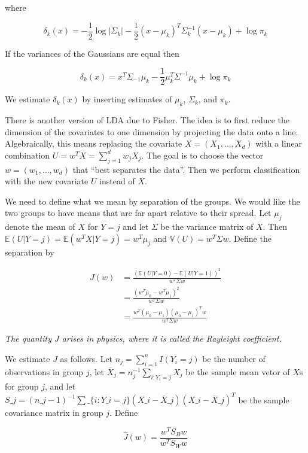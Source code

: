 where

\[ \delta_{k}(x) = -\frac{1}{2} \log | \Sigma_{k} | - \frac{1}{2} (x - \mu_{k})^T \Sigma_{k}^{-1} (x - \mu_{k}) + \log \pi_{k} \]

If the variances of the Gaussians are equal then

\[ \delta_{k}(x) = x^T \Sigma_{-1} \mu_{k} - \frac{1}{2} \mu_{k}^T \Sigma^{-1} \mu_{k} + \log \pi_{k} \]

We estimate \(\delta_{k}(x)\) by inserting estimates of \(\mu_{k}\),
\(\Sigma_{k}\), and \(\pi_{k}\).

There is another version of LDA due to Fisher. The idea is to first
reduce the dimension of the covariates to one dimension by projecting
the data onto a line. Algebraically, this means replacing the covariate
\(X = (X_{1}, \dots, X_d)\) with a linear combination
\(U = w^T X = \sum_{j=1}^{d} w_{j} X_{j}\). The goal is to choose the vector
\(w = (w_{1}, \dots, w_d)\) that ``best separates the data''. Then we
perform classification with the new covariate \(U\) instead of \(X\).

We need to define what we mean by separation of the groups. We would
like the two groups to have means that are far apart relative to their
spread. Let \(\mu_{j}\) denote the mean of \(X\) for \(Y = j\) and let
\(\Sigma\) be the variance matrix of \(X\). Then
\(\mathbb{E}(U | Y = j) = \mathbb{E}(w^T X | Y = j) = w^T \mu_{j}\) and
\(\mathbb{V}(U) = w^T \Sigma w\). Define the separation by

\begin{align*}
J(w) &= \frac{(\mathbb{E}(U | Y = 0) - \mathbb{E}(U | Y = 1))^{2}}{w^T \Sigma w} \\
&= \frac{(w^T \mu_{0} - w^T \mu_{1})^{2}}{w^T \Sigma w} \\
&= \frac{w^T (\mu_{0} - \mu_{1})(\mu_{0} - \mu_{1})^T w}{w^T \Sigma w}
\end{align*}

\emph{The quantity \(J\) arises in physics, where it is called the
Rayleight coefficient.}

We estimate \(J\) as follows. Let \(n_{j} = \sum_{i=1}^{n} I(Y_{i} = j)\) be
the number of observations in group \(j\), let
\(\overline{X}_{j} = n_{j}^{-1} \sum_{i: Y_{i} = j} X_{j}\) be the sample mean
vetor of \(X\)s for group \(j\), and let $S\_{j} = (n\_{j} - 1)^{-1}
\sum\_\{i: Y\_{i} = j\} (X\_{i} - \overline{X}\_{j})(X\_{i} -
\overline{X}\_{j})^{T} $ be the sample covariance matrix in group \(j\).
Define

\[ \hat{J}(w) = \frac{w^T S_B w}{w^T S_W w} \]


